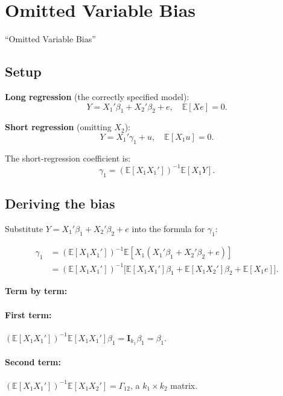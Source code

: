 \documentclass[12pt]{article}
\newcommand{\E}{\mathbb{E}}
\theoremstyle{definition}
\begin{document}
\section{Omitted Variable Bias}
\label{sec:ovb}

\begin{tcolorbox}[colback=blue!5, colframe=blue!50, title=Slide Reference]
``Omitted Variable Bias''
\end{tcolorbox}

\subsection{Setup}

\textbf{Long regression} (the correctly specified model):
\[
Y = X_1'\beta_1 + X_2'\beta_2 + e, \quad \E[Xe] = 0.
\]

\textbf{Short regression} (omitting $X_2$):
\[
Y = X_1'\gamma_1 + u, \quad \E[X_1 u] = 0.
\]

The short-regression coefficient is:
\[
\gamma_1 = (\E[X_1 X_1'])^{-1}\E[X_1 Y].
\]

\subsection{Deriving the bias}

Substitute $Y = X_1'\beta_1 + X_2'\beta_2 + e$ into the formula for $\gamma_1$:

\begin{align*}
\gamma_1 &= (\E[X_1 X_1'])^{-1}\E[X_1(X_1'\beta_1 + X_2'\beta_2 + e)]\\
&= (\E[X_1 X_1'])^{-1}\bigl[\E[X_1 X_1']\beta_1 + \E[X_1 X_2']\beta_2 + \E[X_1 e]\bigr].
\end{align*}

\textbf{Term by term:}

\paragraph{First term:}
$(\E[X_1 X_1'])^{-1}\E[X_1 X_1']\beta_1 = \mathbf{I}_{k_1}\beta_1 = \beta_1.$

\paragraph{Second term:}
$(\E[X_1 X_1'])^{-1}\E[X_1 X_2'] = \Gamma_{12}$, a $k_1 \times k_2$ matrix.
\end{document}
